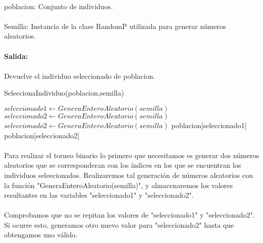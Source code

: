 	\paragraph{}poblacion: Conjunto de individuos.
	
	\paragraph{}Semilla: Instancia de la clase RandomP utilizada para generar números aleatorios.
	
	\paragraph{Salida:}

	\paragraph{}Devuelve el individuo seleccionado de poblacion.
	
	\begin{algorithm}[H]
		\caption{SeleccionaIndividuo(poblacion,semilla)}
		\begin{algorithmic}
			\STATE $seleccionado1 \leftarrow GeneraEnteroAleatorio(semilla)$
			\STATE $seleccionado2 \leftarrow GeneraEnteroAleatorio(semilla)$
			\STATE $seleccionado2 \leftarrow GeneraEnteroAleatorio(semilla)$
			\ENDWHILE
			\RETURN poblacion[seleccionado1]
			\ELSE
			\RETURN poblacion[seleccionado2]
			\ENDIF
		\end{algorithmic}
	\end{algorithm}

	\paragraph{}Para realizar el torneo binario lo primero que necesitamos es generar dos números aleatorios que se corresponderan con los índices en los que se encuentran los individuos seleecionados. Realizaremos tal generación de números aleatorios con la función "GeneraEnteroAleatorio(semilla)", y almacenaremos los valores resultantes en las variables "seleccionado1" y "seleccionado2".
	
	\paragraph{}Comprobamos que no se repitan los valores de "seleccionado1" y "seleccionado2". Si ocurre esto, generamos otro nuevo valor para "seleccionado2" hasta que obtengamos uno válido.
	
